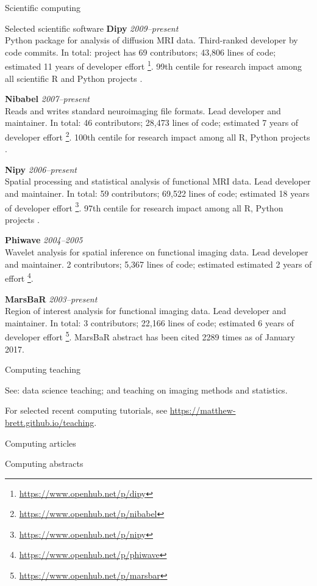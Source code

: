 \documentclass{cv}
\newcommand{\PlaceDateNote}[3]{{\bf #1} \hfill {\em #2} \\#3}
\begin{document}
\begin{cvSection}{Scientific computing}
\begin{cvSubSection}{Selected scientific software}
\PlaceDateNote{Dipy}{2009--present}
{Python package for analysis of diffusion MRI data.  Third-ranked developer by
    code commits.  In total: project has 69 contributors; 43,806 lines of code;
    estimated 11 years of developer effort
\footnote{\url{https://www.openhub.net/p/dipy}}. 99th centile for research
impact among all scientific R and Python projects .}

\PlaceDateNote{Nibabel}{2007--present}
{Reads and writes standard neuroimaging file
    formats.  Lead developer and maintainer.  In total: 46 contributors;
    28,473 lines of code; estimated 7 years of developer effort
    \footnote{\url{https://www.openhub.net/p/nibabel}}.  100th centile for
    research impact among all R, Python projects .}

\PlaceDateNote{Nipy}{2006--present}
{Spatial processing and statistical analysis
of functional MRI data.  Lead developer and maintainer.  In total: 59
contributors; 69,522 lines of code; estimated 18 years of developer effort
\footnote{\url{https://www.openhub.net/p/nipy}}.  97th centile for research
impact among all R, Python projects \footref{depsy}.}

\PlaceDateNote{Phiwave}{2004--2005}
{Wavelet analysis for spatial inference on
functional imaging data.  Lead developer and maintainer.  2 contributors;
5,367 lines of code; estimated estimated 2 years of effort
\footnote{\url{https://www.openhub.net/p/phiwave}}.}

\PlaceDateNote{MarsBaR}{2003--present}
{Region of interest analysis for functional
    imaging data.  Lead developer and maintainer.  In total: 3 contributors;
22,166 lines of code; estimated 6 years of developer effort
\footnote{\url{https://www.openhub.net/p/marsbar}}.  MarsBaR abstract has been
cited 2289 times as of January 2017.}

\end{cvSubSection}

\begin{cvSubSection}{Computing teaching}

    See: data science teaching; and teaching on imaging methods and statistics.

    For selected recent computing tutorials, see
    \url{https://matthew-brett.github.io/teaching}.

\end{cvSubSection}

\begin{cvSubSection}{Computing articles}

\printbibliography[heading=none,
    keyword=computing,
    keyword=article,
notkeyword=omit]

\end{cvSubSection}

\begin{cvSubSection}{Computing abstracts}

\printbibliography[heading=none,
    keyword=computing,
    keyword=abstract,
notkeyword=omit]

\end{cvSubSection}

\end{cvSection}
\end{document}
